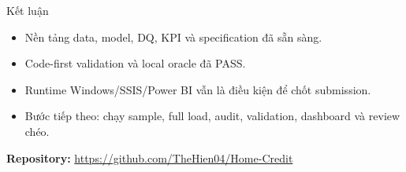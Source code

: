 \documentclass[aspectratio=169,11pt]{beamer}
\begin{document}
\begin{frame}{Kết luận}
\begin{itemize}
  \item Nền tảng data, model, DQ, KPI và specification đã sẵn sàng.
  \item Code-first validation và local oracle đã PASS.
  \item Runtime Windows/SSIS/Power BI vẫn là điều kiện để chốt submission.
  \item Bước tiếp theo: chạy sample, full load, audit, validation, dashboard và review chéo.
\end{itemize}
\vfill
\centering
\textbf{Repository:} \url{https://github.com/TheHien04/Home-Credit}
\end{frame}
\end{document}
